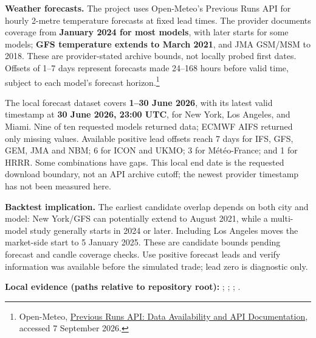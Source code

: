 \documentclass[10pt,a4paper]{article}
\begin{document}
\textbf{Weather forecasts.}
The project uses Open-Meteo's Previous Runs API for hourly 2-metre temperature
forecasts at fixed lead times. The provider documents coverage from
\textbf{January 2024 for most models}, with later starts for some models;
\textbf{GFS temperature extends to March 2021}, and JMA GSM/MSM to 2018.
These are provider-stated archive bounds, not locally probed first dates.
Offsets of 1--7 days represent forecasts made 24--168 hours before valid time,
subject to each model's forecast horizon.\footnote{Open-Meteo,
\href{https://open-meteo.com/en/docs/previous-runs-api#data-availability}{Previous Runs API: Data Availability and API Documentation},
accessed 7 September 2026.}

The local forecast dataset covers \textbf{1--30 June 2026}, with its latest
valid timestamp at \textbf{30 June 2026, 23:00 UTC}, for New York, Los Angeles,
and Miami. Nine of ten requested models returned data; ECMWF AIFS returned
only missing values. Available positive lead offsets reach 7 days for IFS,
GFS, GEM, JMA and NBM; 6 for ICON and UKMO; 3 for M\'et\'eo-France; and 1 for
HRRR. Some combinations have gaps. This local end date is the requested
download boundary, not an API archive cutoff; the newest provider timestamp
has not been measured here.

\textbf{Backtest implication.}
The earliest candidate overlap depends on both city and model: New York/GFS
can potentially extend to August 2021, while a multi-model study generally
starts in 2024 or later. Including Los Angeles moves the market-side start
to 5 January 2025. These are candidate bounds pending forecast and candle
coverage checks. Use positive forecast leads and verify information was
available before the simulated trade; lead zero is diagnostic only.

{\footnotesize
\textbf{Local evidence (paths relative to repository root):}
;
;
;
.
}
\end{document}
